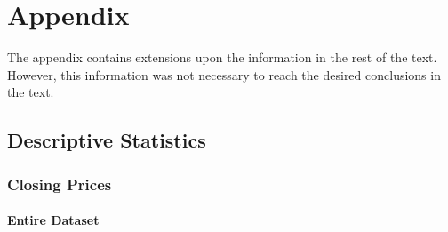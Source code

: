 
\chapter{Appendix}
\label{appendix:dataAppendix}

The appendix contains extensions upon the information in the rest of the text. However, this information was not necessary to reach the desired conclusions in the text.

\section{Descriptive Statistics}
\label{appendix:descriptiveStatistics}

\subsection{Closing Prices}

\subsubsection{Entire Dataset}

